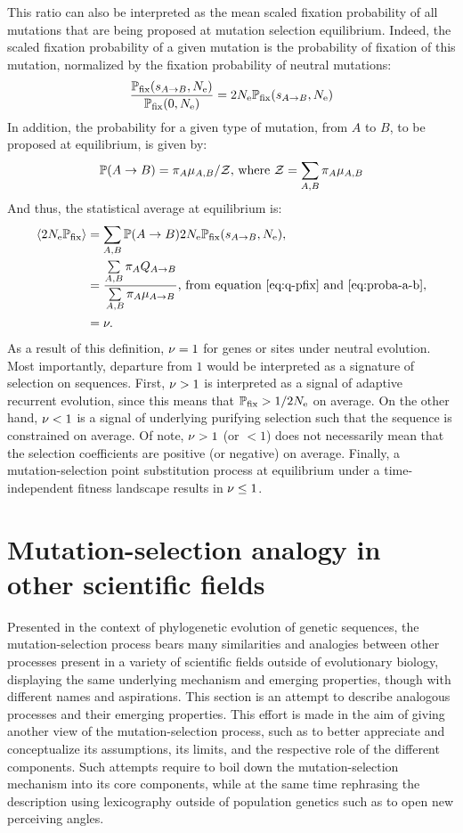 This ratio can also be interpreted as the mean scaled fixation probability of all mutations that are being proposed at mutation selection equilibrium.
Indeed, the scaled fixation probability of a given mutation is the probability of fixation of this mutation, normalized by the fixation probability of neutral mutations:
\begin{align}
    \dfrac{\mathbb{P}_{\text{fix}} (s_{A \to B}, N_{\text{e}})}{\mathbb{P}_{\text{fix}} (0, N_{\text{e}})} = 2 N_{\text{e}} \mathbb{P}_{\text{fix}} (s_{A \to B}, N_{\text{e}})
\end{align}
In addition, the probability for a given type of mutation, from $A$ to $B$, to be proposed at equilibrium, is given by:
\begin{align}
    \mathbb{P} (A \to B) = \pi_{A}  \mu_{A, B} / \mathcal{Z} \text{, where } \mathcal{Z} = \sum\limits_{A, B} \pi_{A} \mu_{A, B} \label{eq:proba-a-b}
\end{align}
And thus, the statistical average at equilibrium is:
\begin{align}
    \left\langle 2 N_{\text{e}} \mathbb{P}_{\text{fix}} \right\rangle & = \sum\limits_{A, B}  \mathbb{P} (A \to B) 2 N_{\text{e}} \mathbb{P}_{\text{fix}} (s_{A \to B}, N_{\text{e}}), \\
    & = \dfrac{ \sum\limits_{A, B} \pi_{A} Q_{A \to B}}{\sum\limits_{A, B} \pi_{A} \mu_{A \to B}} \text{, from equation~\ref{eq:q-pfix} and~\ref{eq:proba-a-b}}, \\
    & = \nu.
\end{align}
As a result of this definition, $\nu=1$ for genes or sites under neutral evolution.
Most importantly, departure from $1$ would be interpreted as a signature of selection on sequences.
First, $\nu>1$ is interpreted as a signal of adaptive recurrent evolution, since this means that $\mathbb{P}_{\text{fix}} > 1/2 N_{\text{e}}$ on average.
On the other hand, $\nu<1$ is a signal of underlying purifying selection such that the sequence is constrained on average.
Of note, $ \nu > 1$ (or $ < 1$) does not necessarily mean that the selection coefficients are positive (or negative) on average.
Finally, a mutation-selection point substitution process at equilibrium under a time-independent fitness landscape results in $\nu \leq 1$.


\section{Mutation-selection analogy in other scientific fields}

Presented in the context of phylogenetic evolution of genetic sequences, the mutation-selection process bears many similarities and analogies between other processes present in a variety of scientific fields outside of evolutionary biology, displaying the same underlying mechanism and emerging properties, though with different names and aspirations.
This section is an attempt to describe analogous processes and their emerging properties.
This effort is made in the aim of giving another view of the mutation-selection process, such as to better appreciate and conceptualize its assumptions, its limits, and the respective role of the different components.
Such attempts require to boil down the mutation-selection mechanism into its core components, while at the same time rephrasing the description using lexicography outside of population genetics such as to open new perceiving angles.


